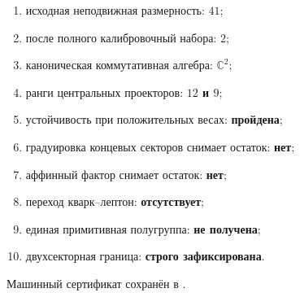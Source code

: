 \begin{protocol}
\begin{enumerate}
 \item исходная неподвижная размерность: \textbf{$41$};
 \item после полного калибровочный набора: \textbf{$2$};
 \item каноническая коммутативная алгебра: \textbf{$\mathbb C^2$};
 \item ранги центральных проекторов: \textbf{$12$ и $9$};
 \item устойчивость при положительных весах: \textbf{пройдена};
 \item градуировка концевых секторов снимает остаток: \textbf{нет};
 \item аффинный фактор снимает остаток: \textbf{нет};
 \item переход кварк--лептон: \textbf{отсутствует};
 \item единая примитивная полугруппа: \textbf{не получена};
 \item двухсекторная граница: \textbf{строго зафиксирована}.
\end{enumerate}
\end{protocol}

Машинный сертификат сохранён в
.
